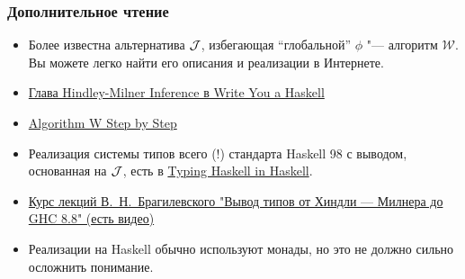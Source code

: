 \documentclass[11pt]{beamer}
\begin{document}
\begin{frame}[fragile]
\frametitle{Дополнительное чтение}
\begin{itemize}
    \item Более известна альтернатива $\mathcal{J}$, избегающая \enquote{глобальной} $\phi$ "--- алгоритм $\mathcal{W}$. Вы можете легко найти его описания и реализации в Интернете.
    \item \href{http://dev.stephendiehl.com/fun/006_hindley_milner.html}{Глава Hindley-Milner Inference в Write You a Haskell}
    \item \href{http://citeseerx.ist.psu.edu/viewdoc/summary?doi=10.1.1.65.7733}{Algorithm W Step by Step}
    \item Реализация системы типов всего (!) стандарта Haskell 98 с выводом, основанная на $\mathcal{J}$, есть в \href{https://gist.github.com/chrisdone/0075a16b32bfd4f62b7b}{Typing Haskell in Haskell}.
    \item \href{https://compsciclub.ru/courses/types/2019-spring/classes/}{Курс лекций В.~Н.~Брагилевского "Вывод типов от Хиндли — Милнера до GHC 8.8"  (есть видео)}
    \item Реализации на Haskell обычно используют монады, но это не должно сильно осложнить понимание. 
\end{itemize}
\end{frame}
\end{document}
